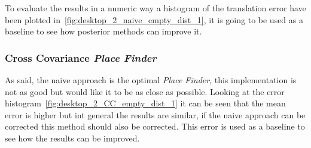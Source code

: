 To evaluate the results in a numeric way a histogram of the translation error have been plotted in~\ref{fig:desktop_2_naive_empty_dist_1}, it is going to be used as a baseline to see how posterior methods can improve it.\\

\subsubsection{Cross Covariance \textit{Place Finder}}
\label{ssub:cross_covariance_place_finder}

As said, the naive approach is the optimal \textit{Place Finder}, this implementation is not as good but would like it to be as close as possible. Looking at the error histogram~\ref{fig:desktop_2_CC_empty_dist_1} it can be seen that the mean error is higher but int general the results are similar, if the naive approach can be corrected this method should also be corrected. This error is used as a baseline to see how the results can be improved.\\

